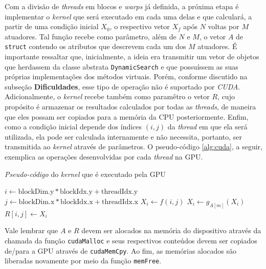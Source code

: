 \documentclass[12pt]{article}
\begin{document}
Com a divisão de \textit{threads} em blocos e \textit{warps} já definida, a
próxima etapa é implementar o \textit{kernel} que será executado em cada uma
delas e que calculará, a partir de uma condição inicial \(X_0\), o respectivo
vetor \(X_f\) após \(N\) voltas por \(M\)
atuadores. Tal função recebe como parâmetro, além de \(N\) e \(M\), o vetor
\(A\) de \texttt{struct} contendo os atributos que descrevem cada um dos \(M\)
atuadores. É importante ressaltar que, inicialmente, a ideia era transmitir um
vetor de objetos que herdassem da classe abstrata \texttt{DynamicSearch} e que
possuíssem as suas próprias implementações dos métodos virtuais. Porém, conforme
discutido na subseção \textbf{Dificuldades}, esse tipo de operação não é
suportado por \textit{CUDA}. Adicionalmente, o \textit{kernel} recebe também
como paramêtro o vetor $R$, cujo propósito é armazenar os resultados calculados
por todas as \textit{threads}, de maneira que eles possam ser copiados para a
memória da CPU posteriormente. Enfim, como a condição inicial depende dos
índices \((i,j)\) da \textit{thread} em que ela será utilizada, ela pode ser
calculada internamente e não necessita, portanto, ser transmitida ao
\textit{kernel} através de parâmetros. O pseudo-código \ref{alg:cuda}, a seguir,
exemplica as operações desenvolvidas por cada \textit{thread} na GPU.


\begin{algorithm}
\caption{\label{alg:cuda} \textit{Pseudo-código} do \textit{kernel} que é
executado pela GPU} \begin{algorithmic}[1]
  	\State ${i} \gets \text{blockDim.y} * \text{blockIdx.y} + \text{threadIdx.y} $  
  	\State ${j} \gets \text{blockDim.x} * \text{blockIdx.x} + \text{threadIdx.x} $   
    \State ${X_i} \gets f(i,j) $ 
     
         
        	\State $X_i \gets g_{A[m]} (X_i)$ 
    	\EndFor
    \EndFor
    \State ${R[i,j]} \gets X_i $ 
   \EndFunction

\end{algorithmic}
\end{algorithm}

Vale lembrar que \(A\) e \(R\) devem ser alocados na memória do dispositivo
através da chamada da função \texttt{cudaMalloc} e seus respectivos conteúdos
devem ser copiados de/para a GPU através de \texttt{cudaMemCpy}. Ao fim, as
memórias alocados são liberadas novamente por meio da função \texttt{memFree}.
\end{document}
